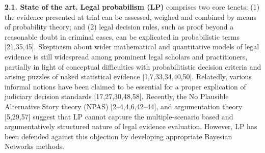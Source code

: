 \documentclass[11pt,dvipsnames,enabledeprecatedfontcommands]{scrartcl}
\begin{document}
\noindent \large \textbf{2.1. State of the art.}
\normalsize \textbf{Legal probabilism (LP)} comprises two core tenets:
(1) the evidence presented at trial can be assessed, weighed and
combined by means of probability theory; and (2) legal decision rules,
such as proof beyond a reasonable doubt in criminal cases, can be
explicated in probabilistic terms {[}21,35,45{]}. Skepticism about wider
mathematical and quantitative models of legal evidence is still
widespread among prominent legal scholars and practitioners, partially
in light of conceptual difficulties with probabilitistic decision
criteria and arising puzzles of naked statistical evidence
{[}1,7,33,34,40,50{]}. Relatedly, various informal notions have been
claimed to be essential for a proper explication of judiciary decision
standards {[}17,27,30,48,58{]}. Recently, the No Plausible Alternative
Story theory (NPAS) {[}2--4,4,6,42--44{]}, and argumentation theory
{[}5,29,57{]} suggest that LP cannot capture the multiple-scenario based
and argumentatively structured nature of legal evidence evaluation.
However, LP has been defended against this objection by developing
appropriate Bayesian Networks methods.
\end{document}

